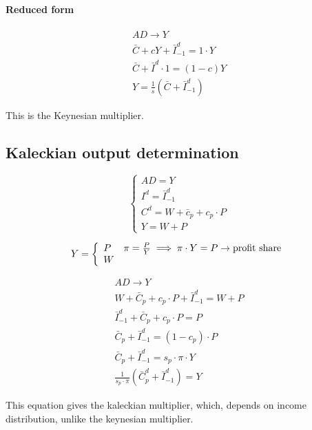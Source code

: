 \documentclass{report}
\begin{document}
\paragraph{Reduced form}
\begin{equation}
\begin{aligned}
        AD \rightarrow Y \\
        \bar{C}+cY+\bar{I}^d_{-1}=1\cdot Y \\
        \bar{C} + \bar{I}^d \cdot 1 = (1 - c)Y \\
        Y=\frac{1}{s}(\bar{C}+\bar{I}^d_{-1})
\end{aligned}
\end{equation}

This is the Keynesian multiplier.

\subsection{Kaleckian output determination}
\[ 
\left\{ \begin{array}{l} 
AD = Y \\
I^d = \bar{I}^d_{-1} \\
C^d = W+\bar{c}_p+c_p\cdot P \\
Y=W+P
\end{array} \right.
\]

\[ 
Y=
\left\{ \begin{array}{l l}
    P & \pi=\frac{P}{Y} \implies \pi \cdot Y=P \rightarrow \text{profit share} \\
    W  &
\end{array} \right
.\]

\begin{equation}
\begin{aligned}
    AD \longrightarrow Y \\
    W+\bar{C}_p+c_p\cdot P+\bar{I}^d_{-1}=W+P \\
    \bar{I}^d_{-1}+\bar{C}_p+c_p\cdot P=P \\
    \bar{C}_p+\bar{I}^d_{-1}=(1-c_p)\cdot P \\
    \bar{C}_p+\bar{I}^d_{-1}=s_p \cdot \pi \cdot Y  \\
    \frac{1}{s_p \cdot \pi}(\bar{C}^d_p+\bar{I}^d_{-1})=Y
\end{aligned}
\end{equation}

This equation gives the kaleckian multiplier, which, depends on income distribution, unlike the keynesian multiplier. 
\end{document}
